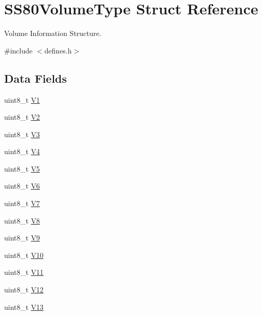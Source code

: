 \hypertarget{structSS80VolumeType}{}\section{S\+S80\+Volume\+Type Struct Reference}
\label{structSS80VolumeType}


Volume Information Structure.  




{\ttfamily \#include $<$defines.\+h$>$}

\subsection*{Data Fields}
\begin{DoxyCompactItemize}
\item 
uint8\+\_\+t \hyperlink{structSS80VolumeType_a42641e28498bceac017fcc016f7441a5}{V1}
\item 
uint8\+\_\+t \hyperlink{structSS80VolumeType_ad0c6f3af1c94d925d5e297252a5f22af}{V2}
\item 
uint8\+\_\+t \hyperlink{structSS80VolumeType_a968e3149dd6956c2305fb89b182be16e}{V3}
\item 
uint8\+\_\+t \hyperlink{structSS80VolumeType_af9d8bebf55fc497315218fe31308fb67}{V4}
\item 
uint8\+\_\+t \hyperlink{structSS80VolumeType_a0dd8407a160f58905f93cedcf89c92a4}{V5}
\item 
uint8\+\_\+t \hyperlink{structSS80VolumeType_ae75294f5cb3a30f1364b44ec67ae0efd}{V6}
\item 
uint8\+\_\+t \hyperlink{structSS80VolumeType_ab3b5337987dc6c7806fc290a819c5c8c}{V7}
\item 
uint8\+\_\+t \hyperlink{structSS80VolumeType_a0859b6387f103bf2c3aee91d8786f4a8}{V8}
\item 
uint8\+\_\+t \hyperlink{structSS80VolumeType_aeea3a5985e301877bb9011e2df62b427}{V9}
\item 
uint8\+\_\+t \hyperlink{structSS80VolumeType_a5417c71bb5987247189a7cef0c47f333}{V10}
\item 
uint8\+\_\+t \hyperlink{structSS80VolumeType_a2d8a582e92f18564ced53fc8e5549e53}{V11}
\item 
uint8\+\_\+t \hyperlink{structSS80VolumeType_a28e1a9ed69ffd15b93665cc228f292ae}{V12}
\item 
uint8\+\_\+t \hyperlink{structSS80VolumeType_a07df35f7acf6e018789c9fa0e4986665}{V13}
\end{DoxyCompactItemize}


